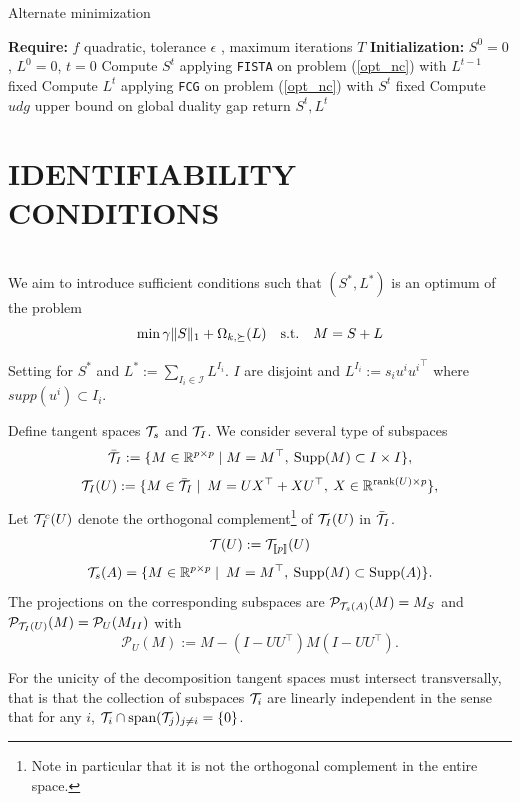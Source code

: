 \documentclass[letterpaper]{article}
\begin{document}
\begin{algorithm*}
\caption{Alternate minimization}
\label{alg:alt}
\begin{algorithmic}[1]
\State\textbf{Require: } $f$ quadratic, tolerance $\epsilon$ , maximum iterations $T$
\State\textbf{Initialization: } $S^{0}=0$, $L^{0}=0$, $t=0$
\State Compute $S^{t}$ applying \texttt{FISTA} on problem (\ref{opt_nc}) with $L^{t-1}$ fixed
\State Compute $L^{t}$ applying \texttt{FCG} on problem (\ref{opt_nc}) with $S^{t}$ fixed
\State Compute $udg$ upper bound on global duality gap
\State return $S^{t}, L^{t}$
\EndIf
\EndFor
\end{algorithmic}
\end{algorithm*}





\section{IDENTIFIABILITY CONDITIONS}

\\
We aim to introduce sufficient conditions such that $(S^*, L^*)$ is an optimum of the problem
$$
\displaystyle \min \gamma \|S\|_1+\Omega_{k,\succeq}(L) \quad \text{\text{s.t.}} \quad M=S+L
$$

Setting for $S^*$ and $L^*:=\sum_{I_i \in \mathcal{I}} L^{I_i}$. $I$ are disjoint and $L^{I_i}:=s_i u^i {u^i}^{\top}$ where $supp(u^i)\subset I_i$.

Define tangent spaces $\mathcal{T}_s$ and $\mathcal{T}_I$. We consider several type of subspaces
$$\bar{\mathcal{T}}_I:=\{M \in \mathbb{R}^{p \times p}\mid  M=M^\top, \: {\rm Supp}(M)\subset I \times I\},$$
$$\mathcal{T}_I(U):=\{M \in \bar{\mathcal{T}}_I\mid \: M=UX^\top+XU^\top,\: X \in \mathbb{R}^{\text{rank}(U) \times p} \},$$
Let $\mathcal{T}^c_I(U)$ denote the orthogonal complement\footnote{Note in particular that it is not the orthogonal complement in the entire space.} of $\mathcal{T}_I(U)$ in $\bar{\mathcal{T}}_I$. 
$$\mathcal{T}(U):=\mathcal{T}_{[\![p]\!]}(U)$$
$$\mathcal{T}_s(A)=\{M \in \mathbb{R}^{p \times p}\mid  \: M=M^\top, \: {\rm Supp}(M)\subset {\rm Supp}(A)\}.$$
The projections on the corresponding subspaces are $\mathcal{P}_{\mathcal{T}_s(A)}(M)=M_S$ and $\mathcal{P}_{\mathcal{T}_I(U)}(M)=\mathcal{P}_{U}(M_{II})$ with $$\mathcal{P}_U(M):=M-(I-UU^\top)M(I-UU^\top).$$


For the unicity of the decomposition tangent spaces must intersect transversally, that is that the collection of subspaces $\mathcal{T}_i$ are linearly independent in the sense that for any $i$, $\mathcal{T}_i \cap \text{span}(\mathcal{T}_j)_{j \neq i}=\{0\}$.
\end{document}
